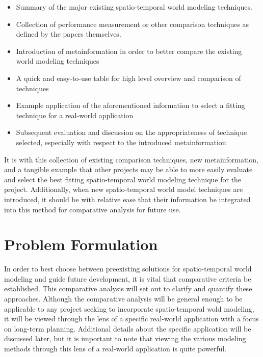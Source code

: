   \begin{itemize}
    \item Summary of the major existing spatio-temporal world modeling techniques.

    \item Collection of performance measurement or other comparison techniques as
      defined by the papers themselves.

    \item Introduction of metainformation in order to better compare the existing
      world modeling techniques

    \item A quick and easy-to-use table for high level overview and comparison of techniques

    \item Example application of the aforementioned information to select a fitting
      technique for a real-world application

    \item Subsequent evaluation and discussion on the appropriateness of technique
      selected, especially with respect to the introduced metainformation

  \end{itemize}

  It is with this collection of existing comparison techniques, new metainformation,
  and a tangible example that other projects may be able to more easily evaluate
  and select the best fitting spatio-temporal world modeling technique for the
  project. Additionally, when new spatio-temporal world model techniques are
  introduced, it should be with relative ease that their information be integrated
  into this method for comparative analysis for future use.



  \section{ Problem Formulation }

  In order to best choose between preexisting solutions for spatio-temporal
  world modeling and guide future development, it is vital that comparative criteria be
  established. This comparative analysis will set out to clarify and quantify
  these approaches. Although the comparative analysis will be general enough to be
  applicable to any project seeking to incorporate spatio-temporal wold modeling,
  it will be viewed through the lens of a specific real-world application
  with a focus on long-term planning. Additional details about the specific application
  will be discussed later, but it is important to note that viewing the
  various modeling methods through this lens of a real-world application is quite
  powerful. \\


